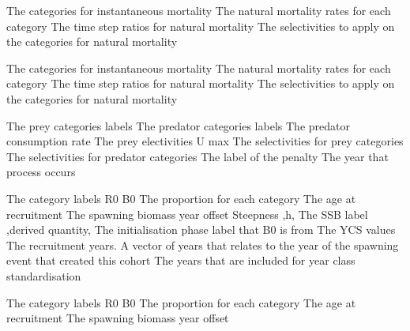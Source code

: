  {The categories for instantaneous mortality}
 {The natural mortality rates for each category}
 {The time step ratios for natural mortality}
 {The selectivities to apply on the categories for natural mortality}
\par\textbf{}\par
{} {The categories for instantaneous mortality}
 {The natural mortality rates for each category}
 {The time step ratios for natural mortality}
 {The selectivities to apply on the categories for natural mortality}
\par\textbf{}\par
{} {The prey categories labels}
 {The predator categories labels}
 {The predator consumption rate}
 {The prey electivities}
 {U max}
 {The selectivities for prey categories}
 {The selectivities for predator categories}
 {The label of the penalty}
 {The year that process occurs}
\par\textbf{}\par
{} {The category labels}
 {R0}
 {B0}
 {The proportion for each category}
 {The age at recruitment}
 {The spawning biomass year offset}
 {Steepness ,h,}
 {The SSB label ,derived quantity,}
 {The initialisation phase label that B0 is from}
 {The YCS values}
 {The recruitment years. A vector of years that relates to the year of the spawning event that created this cohort}
 {The years that are included for year class standardisation}
\par\textbf{}\par
{} {The category labels}
 {R0}
 {B0}
 {The proportion for each category}
 {The age at recruitment}
 {The spawning biomass year offset}
